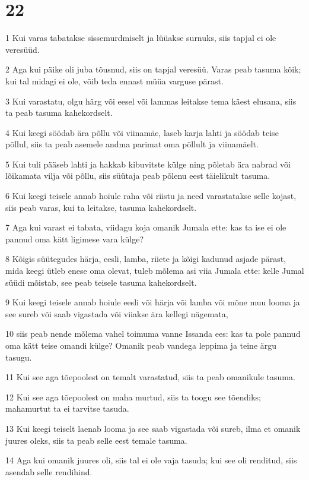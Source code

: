 \chapter{22}

\par 1 Kui varas tabatakse sissemurdmiselt ja lüüakse surnuks, siis tapjal ei ole veresüüd.
\par 2 Aga kui päike oli juba tõusnud, siis on tapjal veresüü. Varas peab tasuma kõik; kui tal midagi ei ole, võib teda ennast müüa varguse pärast.
\par 3 Kui varastatu, olgu härg või eesel või lammas leitakse tema käest elusana, siis ta peab tasuma kahekordselt.
\par 4 Kui keegi söödab ära põllu või viinamäe, laseb karja lahti ja söödab teise põllul, siis ta peab asemele andma parimat oma põllult ja viinamäelt.
\par 5 Kui tuli pääseb lahti ja hakkab kibuvitste külge ning põletab ära nabrad või lõikamata vilja või põllu, siis süütaja peab põlenu eest täielikult tasuma.
\par 6 Kui keegi teisele annab hoiule raha või riistu ja need varastatakse selle kojast, siis peab varas, kui ta leitakse, tasuma kahekordselt.
\par 7 Aga kui varast ei tabata, viidagu koja omanik Jumala ette: kas ta ise ei ole pannud oma kätt ligimese vara külge?
\par 8 Kõigis süütegudes härja, eesli, lamba, riiete ja kõigi kadunud asjade pärast, mida keegi ütleb enese oma olevat, tuleb mõlema asi viia Jumala ette: kelle Jumal süüdi mõistab, see peab teisele tasuma kahekordselt.
\par 9 Kui keegi teisele annab hoiule eesli või härja või lamba või mõne muu looma ja see sureb või saab vigastada või viiakse ära kellegi nägemata,
\par 10 siis peab nende mõlema vahel toimuma vanne Issanda ees: kas ta pole pannud oma kätt teise omandi külge? Omanik peab vandega leppima ja teine ärgu tasugu.
\par 11 Kui see aga tõepoolest on temalt varastatud, siis ta peab omanikule tasuma.
\par 12 Kui see aga tõepoolest on maha murtud, siis ta toogu see tõendiks; mahamurtut ta ei tarvitse tasuda.
\par 13 Kui keegi teiselt laenab looma ja see saab vigastada või sureb, ilma et omanik juures oleks, siis ta peab selle eest temale tasuma.
\par 14 Aga kui omanik juures oli, siis tal ei ole vaja tasuda; kui see oli renditud, siis asendab selle rendihind.

